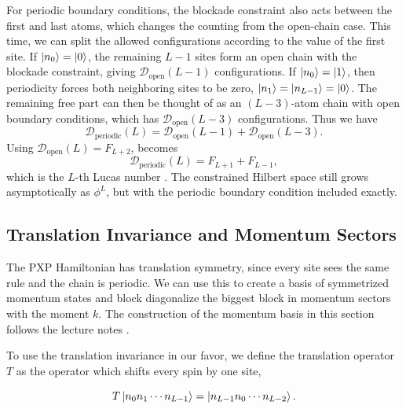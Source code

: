 \documentclass[%
 reprint,
 amsmath,amssymb,
 aps,
]{revtex4-2}
\begin{document}
For periodic boundary conditions, the blockade constraint also acts between the first and last atoms, which changes the counting from the open-chain case. This time, we can split the allowed configurations according to the value of the first site. If $\ket{n_0}=\ket{0}$, the remaining $L-1$ sites form an open chain with the blockade constraint, giving $\mathcal{D}_{\text{open}}(L-1)$ configurations. If $\ket{n_0}=\ket{1}$, then periodicity forces both neighboring sites to be zero, $\ket{n_1}=\ket{n_{L-1}}=\ket{0}$. The remaining free part can then be thought of as an $(L-3)$-atom chain with open boundary conditions, which has $\mathcal{D}_{\text{open}}(L-3)$ configurations. Thus we have
\begin{equation}
\mathcal{D}_{\text{periodic}}(L) = \mathcal{D}_{\text{open}}(L-1) + \mathcal{D}_{\text{open}}(L-3).\label{eq:periodic_open}
\end{equation}
Using $\mathcal{D}_{\text{open}}(L)=F_{L+2}$,  becomes
\begin{equation}
\mathcal{D}_{\text{periodic}}(L) = F_{L+1}+F_{L-1},
\end{equation}
which is the $L$-th Lucas number \cite{OEIS_A000032}. The constrained Hilbert space still grows asymptotically as $\phi^L$, but with the periodic boundary condition included exactly.

\subsection{Translation Invariance and Momentum Sectors}
The PXP Hamiltonian has translation symmetry, since every site sees the same rule and the chain is periodic. We can use this to create a basis of symmetrized momentum states and block diagonalize the biggest block in momentum sectors with the moment $k$. The construction of the momentum basis in this section follows the lecture notes \cite{luitz2026physics767}.

To use the translation invariance in our favor, we define the translation operator $T$ as the operator which shifts every spin by one site,

\begin{equation}
    T\ket{n_0 n_1 \cdots n_{L-1}} = \ket{n_{L-1} n_0 \cdots n_{L-2}} .
\end{equation}
\end{document}
